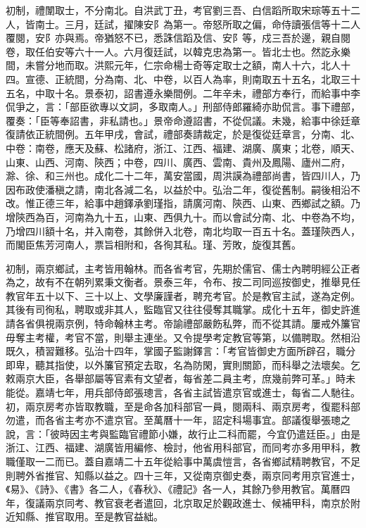 初制，禮闈取士，不分南北。自洪武丁丑，考官劉三吾、白信蹈所取宋琮等五十二人，皆南士。三月，廷試，擢陳安阝為第一。帝怒所取之偏，命侍讀張信等十二人覆閱，安阝亦與焉。帝猶怒不已，悉誅信蹈及信、安阝等，戍三吾於邊，親自閱卷，取任伯安等六十一人。六月復廷試，以韓克忠為第一。皆北士也。然訖永樂間，未嘗分地而取。洪熙元年，仁宗命楊士奇等定取士之額，南人十六，北人十四。宣德、正統間，分為南、北、中卷，以百人為率，則南取五十五名，北取三十五名，中取十名。景泰初，詔書遵永樂間例。二年辛未，禮部方奉行，而給事中李侃爭之，言：「部臣欲專以文詞，多取南人。」刑部侍郎羅綺亦助侃言。事下禮部，覆奏：「臣等奉詔書，非私請也。」景帝命遵詔書，不從侃議。未幾，給事中徐廷章復請依正統間例。五年甲戌，會試，禮部奏請裁定，於是復從廷章言，分南、北、中卷：南卷，應天及蘇、松諸府，浙江、江西、福建、湖廣、廣東；北卷，順天、山東、山西、河南、陝西；中卷，四川、廣西、雲南、貴州及鳳陽、廬州二府，滁、徐、和三州也。成化二十二年，萬安當國，周洪謨為禮部尚書，皆四川人，乃因布政使潘稹之請，南北各減二名，以益於中。弘治二年，復從舊制。嗣後相沿不改。惟正德三年，給事中趙鐸承劉瑾指，請廣河南、陝西、山東、西鄉試之額。乃增陝西為百，河南為九十五，山東、西俱九十。而以會試分南、北、中卷為不均，乃增四川額十名，并入南卷，其餘併入北卷，南北均取一百五十名。蓋瑾陝西人，而閣臣焦芳河南人，票旨相附和，各徇其私。瑾、芳敗，旋復其舊。

初制，兩京鄉試，主考皆用翰林。而各省考官，先期於儒官、儒士內聘明經公正者為之，故有不在朝列累秉文衡者。景泰三年，令布、按二司同巡按御史，推舉見任教官年五十以下、三十以上、文學廉謹者，聘充考官。於是教官主試，遂為定例。其後有司徇私，聘取或非其人，監臨官又往往侵奪其職掌。成化十五年，御史許進請各省俱視兩京例，特命翰林主考。帝諭禮部嚴飭私弊，而不從其請。屢戒外簾官毋奪主考權，考官不當，則舉主連坐。又令提學考定教官等第，以備聘取。然相沿既久，積習難移。弘治十四年，掌國子監謝鐸言：「考官皆御史方面所辟召，職分即卑，聽其指使，以外簾官預定去取，名為防閑，實則關節，而科舉之法壞矣。乞敕兩京大臣，各舉部屬等官素有文望者，每省差二員主考，庶幾前弊可革。」時未能從。嘉靖七年，用兵部侍郎張璁言，各省主試皆遣京官或進士，每省二人馳往。初，兩京房考亦皆取教職，至是命各加科部官一員，閱兩科、兩京房考，復罷科部勿遣，而各省主考亦不遣京官。至萬曆十一年，詔定科場事宜。部議復舉張璁之說，言：「彼時因主考與監臨官禮節小嫌，故行止二科而罷，今宜仍遣廷臣。」由是浙江、江西、福建、湖廣皆用編修、檢討，他省用科部官，而同考亦多用甲科，教職僅取一二而已。蓋自嘉靖二十五年從給事中萬虞愷言，各省鄉試精聘教官，不足則聘外省推官、知縣以益之。四十三年，又從南京御史奏，兩京同考用京官進士，《易》、《詩》、《書》各二人，《春秋》、《禮記》各一人，其餘乃參用教官。萬曆四年，復議兩京同考、教官衰老者遣回，北京取足於觀政進士、候補甲科，南京於附近知縣、推官取用。至是教官益絀。

